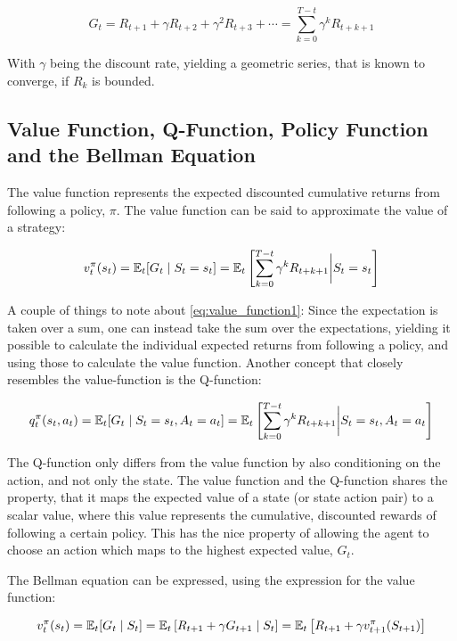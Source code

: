 \begin{equation}
    G_t = R_{t+1} + \gamma R_{t+2} + \gamma^2 R_{t+3} + \cdots = \sum_{k=0}^{T - t} \gamma^k R_{t+k+1}
\end{equation}

With $\gamma$ being the discount rate, yielding a geometric series, that is known to converge, if $R_k$ is bounded.

\subsection{Value Function, Q-Function, Policy Function and the Bellman Equation}

The value function represents the expected discounted cumulative returns from following a policy, $\pi$. The value function can be said to approximate the value of a strategy:

\begin{equation}\label{eq:value_function1}
    v_{t}^{\pi}(s_t) = \mathbb{E}_t [G_t \mid S_t = s_t] = \mathbb{E}_t \left[ \sum_{k=0}^{T - t} \gamma^k R_{t+k+1} \bigg\vert S_t = s_t \right] 
\end{equation}


A couple of things to note about \eqref{eq:value_function1}: Since the expectation is taken over a sum, one can instead take the sum over the expectations, yielding it possible to calculate the individual expected returns from following a policy, and using those to calculate the value function. Another concept that closely resembles the value-function is the Q-function:

\begin{equation}
    q_t^{\pi} (s_t, a_t) = \mathbb{E}_t [G_t \mid S_t = s_t, A_t = a_t ] = \mathbb{E}_t \left[ \sum_{k=0}^{T - t} \gamma^k R_{t+k+1} \bigg\vert S_t = s_t, A_t = a_t\right] 
\end{equation}

The Q-function only differs from the value function by also conditioning on the action, and not only the state. The value function and the Q-function shares the property, that it maps the expected value of a state (or state action pair) to a scalar value, where this value represents the cumulative, discounted rewards of following a certain policy. This has the nice property of allowing the agent to choose an action which maps to the highest expected value, $G_t$.

The Bellman equation can be expressed, using the expression for the value function:

\begin{equation}
    v^{\pi}_{t} (s_t) = \mathbb{E}_t [G_t \mid S_t] = \mathbb{E}_t  \left[ R_{t+1} + \gamma G_{t+1} \mid S_t \right] = \mathbb{E}_t \left[ R_{t+1} + \gamma v_{t+1}^{\pi}(S_{t+1}) \right]
\end{equation}

